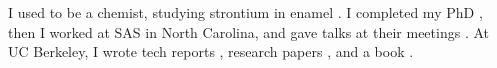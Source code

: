 \documentclass{article}
\begin{document}
	I used to be a chemist, studying strontium in enamel
	\cite{strontiummottling,stablestrontium}. I completed my PhD \cite{phd}, then I worked at SAS in North Carolina, and gave talks at their
	meetings \cite{sugirepeated}. At UC Berkeley, I wrote tech reports \cite{xrandom}, research papers \cite{wic}, and a book \cite{datamanipulation}.
	
\end{document}
